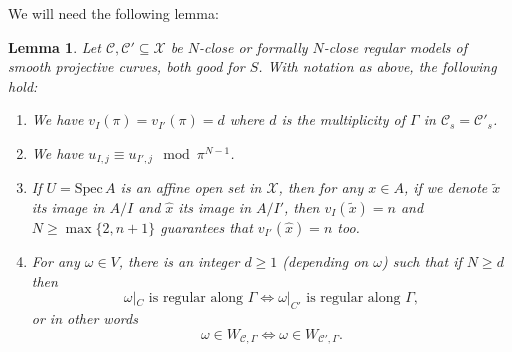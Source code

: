 \documentclass{article}
\theoremstyle{definition}
\theoremstyle{plain}
\newtheorem{lemma}[defn]{Lemma}
\theoremstyle{remark}
\newcommand{\spec}{\mathrm{Spec}\,}
\begin{document}
	We will need the following lemma:
	\begin{lemma}\label{differential_lemma}
		Let $\mathcal{C}, \mathcal{C}'\subseteq \mathcal{X}$ be $N$-close or formally $N$-close regular models of smooth projective curves, both good for $S$. With notation as above, the following hold:
		\begin{enumerate}
			\item[$(1)$] We have $v_I(\pi) = v_{I'}(\pi) = d$ where $d$ is the multiplicity of $\Gamma$ in $\mathcal{C}_s = \mathcal{C}'_s$.
			\item[$(2)$] We have $u_{I,j}\equiv u_{I',j} \mod \pi^{N-1}$.
			\item[$(3)$] If $U = \spec A$ is an affine open set in $\mathcal{X}$, then for any $x\in A$, if we denote $\widetilde{x}$ its image in $A/I$ and $\widehat{x}$ its image in $A/I'$, then $v_I(\widetilde{x}) = n$ and $N\ge \max\{2, n+1\}$ guarantees that $v_{I'}(\widehat{x}) = n$ too.
			\item[$(4)$] For any $\omega\in V$, there is an integer $d\ge 1$ (depending on $\omega$) such that if $N\ge d$ then
			\[\omega|_C\text{ is regular along $\Gamma$}\iff \omega|_{C'}\text{ is regular along $\Gamma$},\]
			or in other words
			\[\omega \in W_{\mathcal{C}, \Gamma} \iff \omega \in W_{\mathcal{C}', \Gamma}.\]
		\end{enumerate}
	\end{lemma}
\end{document}
